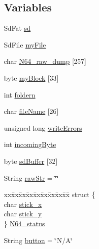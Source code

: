 \subsection*{Variables}
\begin{DoxyCompactItemize}
\item 
Sd\-Fat \hyperlink{Uno__N64__Controller__Pak__Reader_8ino_a15e6b7e1f0fb2d1e0fe1654721bb5302}{sd}
\item 
Sd\-File \hyperlink{Uno__N64__Controller__Pak__Reader_8ino_a16f52ba77735956c329c6df0a52aba8b}{my\-File}
\item 
char \hyperlink{Uno__N64__Controller__Pak__Reader_8ino_ae8803a7ccd85598955cfa9d4f3561ac9}{N64\-\_\-raw\-\_\-dump} \mbox{[}257\mbox{]}
\item 
byte \hyperlink{Uno__N64__Controller__Pak__Reader_8ino_a8b202f44f04f63fc925047860625793d}{my\-Block} \mbox{[}33\mbox{]}
\item 
int \hyperlink{Uno__N64__Controller__Pak__Reader_8ino_a682c3bf7777c52fec7975e785aaa5eb7}{foldern}
\item 
char \hyperlink{Uno__N64__Controller__Pak__Reader_8ino_ad5627db776ac243c3c2acb1bf6928138}{file\-Name} \mbox{[}26\mbox{]}
\item 
unsigned long \hyperlink{Uno__N64__Controller__Pak__Reader_8ino_ab5b51e6cb78664c28c70281cf73e6c92}{write\-Errors}
\item 
int \hyperlink{Uno__N64__Controller__Pak__Reader_8ino_ae563354a0218546aca0b276f84a85755}{incoming\-Byte}
\item 
byte \hyperlink{Uno__N64__Controller__Pak__Reader_8ino_ae7ec651b340ef0dc409255ab3d008396}{sd\-Buffer} \mbox{[}32\mbox{]}
\item 
String \hyperlink{Uno__N64__Controller__Pak__Reader_8ino_a2c9dda16ae6e126e47f234ee77a306c9}{raw\-Str} = \char`\"{}\char`\"{}
\item 
\begin{tabbing}
xx\=xx\=xx\=xx\=xx\=xx\=xx\=xx\=xx\=\kill
struct \{\\
\>char \hyperlink{Uno__N64__Controller__Pak__Reader_8ino_a462c4d416ae2f845eedf11622b33f5ce}{stick\_x}\\
\>char \hyperlink{Uno__N64__Controller__Pak__Reader_8ino_a1ba71f2f35d51bda37947b2cc56f2804}{stick\_y}\\
\} \hyperlink{Uno__N64__Controller__Pak__Reader_8ino_ae91ca2d67107505a8b5c705533a41f43}{N64\_status}\\

\end{tabbing}\item 
String \hyperlink{Uno__N64__Controller__Pak__Reader_8ino_a0a7e6169ae96e651da0b37fae3034554}{button} = \char`\"{}N/A\char`\"{}
\end{DoxyCompactItemize}


